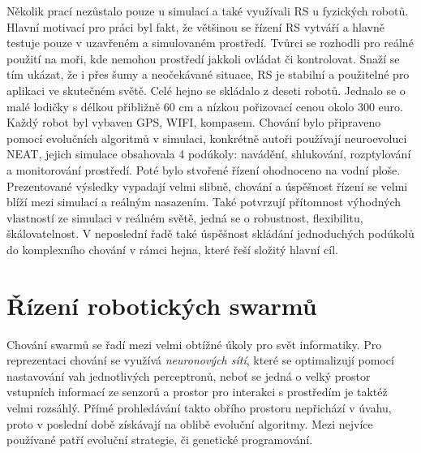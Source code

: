 Několik prací nezůstalo pouze u simulací a také využívali RS u fyzických robotů. Hlavní motivací pro práci \citep{aquaticRobots} byl fakt, že většinou se řízení RS vytváří  a hlavně testuje pouze v uzavřeném a simulovaném prostředí. Tvůrci se rozhodli pro reálné použití na moři, kde nemohou prostředí jakkoli ovládat či kontrolovat. Snaží se tím ukázat, že i přes šumy a neočekávané situace, RS je stabilní a použitelné pro aplikaci ve skutečném světě. Celé hejno se skládalo z deseti robotů. Jednalo se o malé lodičky s délkou přibližně 60 cm a nízkou pořizovací cenou okolo 300 euro. Každý robot byl  vybaven GPS, WIFI, kompasem. Chování bylo připraveno pomocí evolučních algoritmů v simulaci, konkrétně autoři používají neuroevoluci NEAT, jejich simulace obsahovala 4 podúkoly: navádění, shlukování, rozptylování a monitorování prostředí. Poté bylo stvořené řízení ohodnoceno na vodní ploše. Prezentované výsledky vypadají velmi slibně, chování a úspěšnost řízení se velmi blíží mezi simulací a reálným nasazením. Také potvrzují přítomnost výhodných vlastností ze simulaci v reálném světě, jedná se o robustnost, flexibilitu, škálovatelnost. V neposlední řadě také úspěšnost skládání jednoduchých podúkolů do komplexního chování v rámci hejna, které řeší složitý hlavní cíl.  
\section{Řízení robotických swarmů}
Chování swarmů se řadí mezi velmi obtížné úkoly pro svět informatiky. Pro reprezentaci chování se využívá \textit{neuronových sítí}, které se optimalizují pomocí nastavování vah jednotlivých perceptronů, neboť se jedná o velký prostor vstupních informací ze senzorů a prostor pro interakci s prostředím je taktéž velmi rozsáhlý. Přímé prohledávání takto obřího prostoru nepřichází v úvahu, proto v poslední době získávají na oblibě evoluční algoritmy. Mezi nejvíce používané patří evoluční strategie, či genetické programování. \par 

